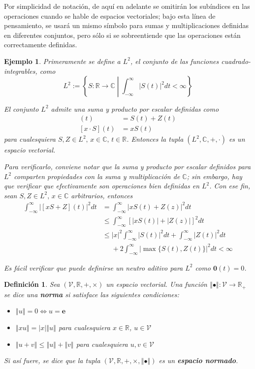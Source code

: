 \documentclass[12pt,letterpaper]{book}
\newtheorem{definicion}{Definición}[chapter]
\newtheorem{ejemplo}{Ejemplo}[chapter]
\newcommand{\R}{\mathbb{R}}
\newcommand{\C}{\mathbb{C}}
\newcommand{\intR}{\int_{-\infty}^{\infty}}
\newcommand{\abso}[1]{\left| #1 \right|}
\newcommand{\norma}[1]{\left\Vert #1 \right\Vert}
\newcommand{\talque}{\mathrel{}\middle|\mathrel{}}
\newcommand{\pheq}{\phantom{=}}
\begin{document}
Por simplicidad de notación, de aquí en adelante se omitirán los subíndices en las operaciones cuando se hable de espacios vectoriales;
bajo esta línea de pensamiento, se usará un mismo símbolo para sumas y multiplicaciones definidas en diferentes conjuntos, pero sólo si se sobreentiende que las operaciones están correctamente definidas.

\begin{ejemplo}
Primeramente se define a $L^2$, el conjunto de las funciones cuadrado-integrables, como
\begin{equation}
L^2 := \left\{ S: \R\rightarrow\C \talque \intR \abso{S(t)}^2 dt < \infty \right\}
\end{equation}

El conjunto $L^2$ admite una suma y producto por escalar definidas como
\begin{align}
[S+Z](t) &= S(t) + Z(t) \\
[x\cdot S](t) &= x S(t)
\end{align}
para cualesquiera $S, Z \in L^{2}, \, x\in \C, \, t\in \R$. 
%
Entonces la tupla $(L^{2}, \C,+,\cdot)$ es un espacio vectorial.

Para verificarlo, conviene notar que la suma y producto por escalar definidos para $L^{2}$ comparten propiedades con la suma y multiplicación de $\C$; sin embargo, hay que verificar que efectivamente son operaciones bien definidas en $L^{2}$.
%
Con ese fin, sean $S, Z \in L^{2}, \, x \in \C$ arbitrarios, entonces
\begin{align*}
\intR \abso{\left[x S + Z\right]\left(t\right)}^2 dt 
&= 
\intR \abso{ xS(t) + Z(z)}^2 dt \\
&\leq
\intR \left[ \abso{ xS(t)} + \abso{ Z(z)} \right]^2 dt \\
&\leq
\abso{x}^{2} \intR \abso{ S(t)}^{2} dt + \intR \abso{ Z(t)}^{2} dt \\
&\pheq
+ 2\intR \abso{ \max\{ S(t), Z(t) \} }^{2} dt < \infty
\end{align*}

Es fácil verificar que puede definirse un neutro aditivo para $L^{2}$ como $\boldsymbol{0}(t) = 0$.
\end{ejemplo}

\begin{definicion}
Sea $(\mathcal{V},\R,+,\times)$ un espacio vectorial. Una función $\norma{\bullet}: \mathcal{V}\rightarrow\R_+$ se dice una \textbf{norma} si satisface las siguientes condiciones:
\begin{itemize}
\item $\norma{u} = 0 \Leftrightarrow u = \boldsymbol{e}$
\item $\norma{x u} = \abso{x} \norma{u}$ para cualesquiera $x \in \R$, $u \in \mathcal{V}$
\item $\norma{u+v} \leq \norma{u} + \norma{v}$ para cualesquiera $u, v \in \mathcal{V}$
\end{itemize}
Si así fuere, se dice que la tupla $(\mathcal{V},\R,+,\times, \norma{\bullet})$ es un \textbf{espacio normado}.
\end{definicion}
\end{document}
